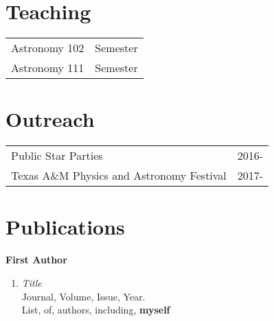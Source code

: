 \documentclass[9pt]{res} %
\begin{document}
\begin{resume}
\section{Teaching}  
		\begin{tabular}{ll}
		Astronomy 102		& \hspace{4cm} Semester \\
		Astronomy 111 		& \hspace{4cm} Semester \\
		\end{tabular}		

\section{Outreach} 
		\begin{tabular}{ll}
		Public Star Parties	&\hspace{1.7cm} 2016- \\
		Texas A\&M Physics and Astronomy Festival 	& \hspace{1.7cm} 2017- \\
		\end{tabular} 

\section{Publications}
{\bf First Author}
                   \begin{enumerate} 
                    \item \emph{Title} \\
                              Journal, Volume, Issue, Year.  \\
                             List, of, authors, including, \textbf{myself} \\                   
                   \end{enumerate}
                
\end{resume} 
\end{document}

